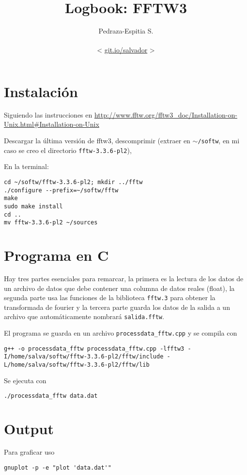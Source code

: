 \documentclass[letterpaper,11pt]{article}
\title{Logbook:  FFTW3}
\author{Pedraza-Espitia S.\\ \\< \url{git.io/salvador} >}
\date{}
\begin{document}
\maketitle
{}

%
%
\section{Instalación}
Siguiendo las instrucciones en \url{http://www.fftw.org/fftw3_doc/Installation-on-Unix.html#Installation-on-Unix}

Descargar la última versión de fftw3, descomprimir (extraer en $\sim$\verb|/softw|, en mi caso se creo el directorio \verb|fftw-3.3.6-pl2|), 

En la terminal:
\begin{lstlisting}
cd ~/softw/fftw-3.3.6-pl2; mkdir ../fftw
./configure --prefix=~/softw/fftw
make
sudo make install
cd ..
mv fftw-3.3.6-pl2 ~/sources
\end{lstlisting}

\section{Programa en C}
Hay tres partes esenciales para remarcar, la primera es la lectura de los datos de un archivo de datos que debe contener una columna de datos reales (float), la segunda parte usa las funciones de la biblioteca \verb|fftw.3| para obtener la transformada de fourier y la tercera parte guarda los datos de la salida a un archivo que automáticamente nombrará \verb|salida.fftw|.


El programa se guarda en un archivo \verb|processdata_fftw.cpp| y se compila con\\
\begin{lstlisting}
g++ -o processdata_fftw processdata_fftw.cpp -lfftw3 -I/home/salva/softw/fftw-3.3.6-pl2/fftw/include -L/home/salva/softw/fftw-3.3.6-pl2/fftw/lib
\end{lstlisting}

Se ejecuta con
\begin{lstlisting}
./processdata_fftw data.dat
\end{lstlisting}
\section{Output}
\label{sec:output}
Para graficar uso
\begin{lstlisting}
gnuplot -p -e "plot 'data.dat'"
\end{lstlisting}



\end{document}

